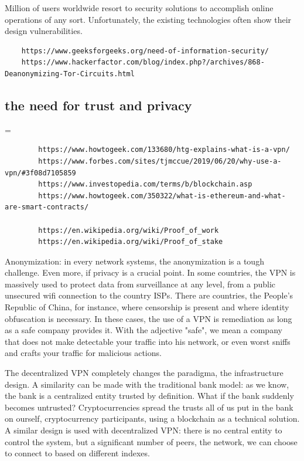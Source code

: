 \documentclass[]{article}
\begin{document}
	Million of users worldwide resort to security solutions to accomplish online operations of any sort. Unfortunately, the existing technologies often show their design vulnerabilities.

	\begin{verbatim}
	https://www.geeksforgeeks.org/need-of-information-security/
	https://www.hackerfactor.com/blog/index.php?/archives/868-Deanonymizing-Tor-Circuits.html
	\end{verbatim}
	
	\subsection{the need for trust and privacy}=
	\begin{verbatim}
		https://www.howtogeek.com/133680/htg-explains-what-is-a-vpn/
		https://www.forbes.com/sites/tjmccue/2019/06/20/why-use-a-vpn/#3f08d7105859
		https://www.investopedia.com/terms/b/blockchain.asp
		https://www.howtogeek.com/350322/what-is-ethereum-and-what-are-smart-contracts/
		
		https://en.wikipedia.org/wiki/Proof_of_work
		https://en.wikipedia.org/wiki/Proof_of_stake
	\end{verbatim}
	
	Anonymization: in every network systems, the anonymization is a tough challenge. Even more, if privacy is a crucial point. In some countries, the VPN is massively used to protect data from surveillance at any level, from a public unsecured wifi connection to the country ISPs. There are countries, the People's Republic of China, for instance, where censorship is present and where identity obfuscation is necessary. In these cases, the use of a VPN is remediation as long as a safe company provides it. With the adjective "safe", we mean a company that does not make detectable your traffic into his network, or even worst sniffs and crafts your traffic for malicious actions. 

	The decentralized VPN completely changes the paradigma, the infrastructure design.
	A similarity can be made with the traditional bank model: as we know, the bank is a centralized entity trusted by definition. What if the bank suddenly becomes untrusted? Cryptocurrencies spread the trusts all of us put in the bank on ourself, cryptocurrency participants, using a blockchain as a technical solution. 
	A similar design is used with decentralized VPN: there is no central entity to control the system, but a significant number of peers, the network, we can choose to connect to based on different indexes.
\end{document}

